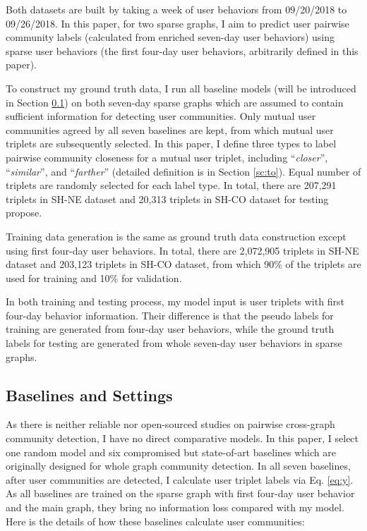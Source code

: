Both datasets are built by taking a week of user behaviors from 09/20/2018 to 09/26/2018. In this paper, for two sparse graphs, I aim to predict user pairwise community labels (calculated from enriched seven-day user behaviors) using sparse user behaviors (the first four-day user behaviors, arbitrarily defined in this paper).

To construct my ground truth data, I run all baseline models (will be introduced in Section \ref{sc:baseline}) on both seven-day sparse graphs which are assumed to contain sufficient information for detecting user communities. Only mutual user communities agreed by all seven baselines are kept, from which mutual user triplets are subsequently selected. In this paper, I define three types to label pairwise community closeness for a mutual user triplet, including ``\textit{closer}'', ``\textit{similar}'', and ``\textit{farther}'' (detailed definition is in Section \ref{sc:to}). Equal number of triplets are randomly selected for each label type. In total, there are 207,291 triplets in SH-NE dataset and 20,313 triplets in SH-CO dataset for testing propose. 

Training data generation is the same as ground truth data construction except using first four-day user behaviors. In total, there are 2,072,905 triplets in SH-NE dataset and  203,123 triplets in SH-CO dataset, from which 90\% of the triplets are used for training and 10\% for validation.

In both training and testing process, my model input is user triplets with first four-day behavior information. Their difference is that the pseudo labels for training are generated from four-day user behaviors, while the ground truth labels for testing are generated from whole seven-day user behaviors in sparse graphs.


\subsection{Baselines and Settings} \label{sc:baseline}
As there is neither reliable nor open-sourced studies on pairwise cross-graph community detection, I have no direct comparative models. In this paper, I select one random model and six compromised but state-of-art baselines which are originally designed for whole graph community detection. In all seven baselines, after user communities are detected, I calculate user triplet labels via Eq. \ref{eq:y}. As all baselines are trained on the sparse graph with first four-day user behavior and the main graph, they bring no information loss compared with my model. Here is the details of how these baselines calculate user communities:

